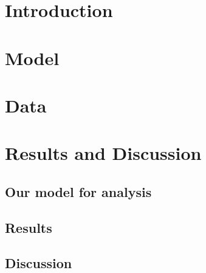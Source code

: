 \documentclass{acm_proc_article-sp}
\begin{document}
\date{8 June, 2012}

\maketitle






\section{Introduction}


\section{Model}



\section{Data}
\label{sectionData}


\section{Results and Discussion}
\subsection{Our model for analysis}


\subsection{Results}


\subsection{Discussion}

\end{document}
